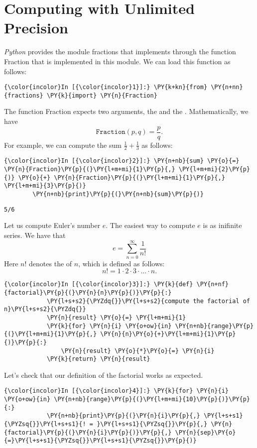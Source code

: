 \section{Computing with Unlimited Precision}
\textsl{Python} provides the module fractions that implements
 through the function Fraction that is
implemented in this module. We can load this function as follows:
\begin{Verbatim}[commandchars=\\\{\}]
{\color{incolor}In [{\color{incolor}1}]:} \PY{k+kn}{from} \PY{n+nn}{fractions} \PY{k}{import} \PY{n}{Fraction}
\end{Verbatim}
The function Fraction expects two arguments, the  and
the . Mathematically, we have
\[ \texttt{Fraction}(p, q) = \frac{p}{q}. \] For example, we can compute
the sum \(\frac{1}{2} + \frac{1}{3}\) as follows:
\begin{Verbatim}[commandchars=\\\{\}]
{\color{incolor}In [{\color{incolor}2}]:} \PY{n+nb}{sum} \PY{o}{=} \PY{n}{Fraction}\PY{p}{(}\PY{l+m+mi}{1}\PY{p}{,} \PY{l+m+mi}{2}\PY{p}{)} \PY{o}{+} \PY{n}{Fraction}\PY{p}{(}\PY{l+m+mi}{1}\PY{p}{,} \PY{l+m+mi}{3}\PY{p}{)}
        \PY{n+nb}{print}\PY{p}{(}\PY{n+nb}{sum}\PY{p}{)}
\end{Verbatim}


\begin{Verbatim}[commandchars=\\\{\}]
5/6
\end{Verbatim}
Let us compute Euler's number \(e\). The easiest way to compute \(e\) is
as inifinite series. We have that
\[ e = \sum\limits_{n=0}^\infty \frac{1}{n!} \] Here \(n!\) denotes the
 of \(n\), which is defined as follows:
\[ n! = 1 \cdot 2 \cdot 3 \cdot {\dots} \cdot n. \]
\begin{Verbatim}[commandchars=\\\{\}]
{\color{incolor}In [{\color{incolor}3}]:} \PY{k}{def} \PY{n+nf}{factorial}\PY{p}{(}\PY{n}{n}\PY{p}{)}\PY{p}{:}
            \PY{l+s+s2}{\PYZdq{}}\PY{l+s+s2}{compute the factorial of n}\PY{l+s+s2}{\PYZdq{}}
            \PY{n}{result} \PY{o}{=} \PY{l+m+mi}{1}
            \PY{k}{for} \PY{n}{i} \PY{o+ow}{in} \PY{n+nb}{range}\PY{p}{(}\PY{l+m+mi}{1}\PY{p}{,} \PY{n}{n}\PY{o}{+}\PY{l+m+mi}{1}\PY{p}{)}\PY{p}{:}
                \PY{n}{result} \PY{o}{*}\PY{o}{=} \PY{n}{i}
            \PY{k}{return} \PY{n}{result}
\end{Verbatim}
Let's check that our definition of the factorial works as expected.
\begin{Verbatim}[commandchars=\\\{\}]
{\color{incolor}In [{\color{incolor}4}]:} \PY{k}{for} \PY{n}{i} \PY{o+ow}{in} \PY{n+nb}{range}\PY{p}{(}\PY{l+m+mi}{10}\PY{p}{)}\PY{p}{:}
            \PY{n+nb}{print}\PY{p}{(}\PY{n}{i}\PY{p}{,} \PY{l+s+s1}{\PYZsq{}}\PY{l+s+s1}{! = }\PY{l+s+s1}{\PYZsq{}}\PY{p}{,} \PY{n}{factorial}\PY{p}{(}\PY{n}{i}\PY{p}{)}\PY{p}{,} \PY{n}{sep}\PY{o}{=}\PY{l+s+s1}{\PYZsq{}}\PY{l+s+s1}{\PYZsq{}}\PY{p}{)}
\end{Verbatim}

